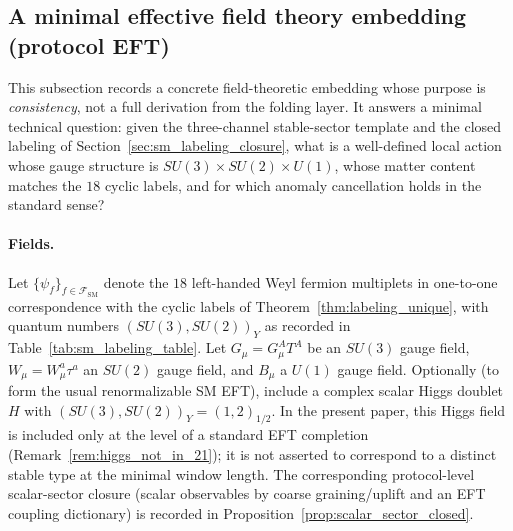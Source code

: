 \subsection{A minimal effective field theory embedding (protocol EFT)}
\label{subsec:protocol_eft}

This subsection records a concrete field-theoretic embedding whose purpose is \emph{consistency}, not a full derivation from the folding layer.
It answers a minimal technical question: given the three-channel stable-sector template and the closed labeling of Section~\ref{sec:sm_labeling_closure}, what is a well-defined local action whose gauge structure is $SU(3)\times SU(2)\times U(1)$, whose matter content matches the $18$ cyclic labels, and for which anomaly cancellation holds in the standard sense?

\paragraph{Fields.}
Let $\{\psi_f\}_{f\in\mathcal{F}_{\mathrm{SM}}}$ denote the $18$ left-handed Weyl fermion multiplets in one-to-one correspondence with the cyclic labels of Theorem~\ref{thm:labeling_unique}, with quantum numbers $(SU(3),SU(2))_Y$ as recorded in Table~\ref{tab:sm_labeling_table}.
Let $G_\mu=G_\mu^A T^A$ be an $SU(3)$ gauge field, $W_\mu=W_\mu^a \tau^a$ an $SU(2)$ gauge field, and $B_\mu$ a $U(1)$ gauge field.
Optionally (to form the usual renormalizable SM EFT), include a complex scalar Higgs doublet $H$ with $(SU(3),SU(2))_Y=(1,2)_{1/2}$.
In the present paper, this Higgs field is included only at the level of a standard EFT completion (Remark~\ref{rem:higgs_not_in_21}); it is not asserted to correspond to a distinct stable type at the minimal window length.
The corresponding protocol-level scalar-sector closure (scalar observables by coarse graining/uplift and an EFT coupling dictionary) is recorded in Proposition~\ref{prop:scalar_sector_closed}.

